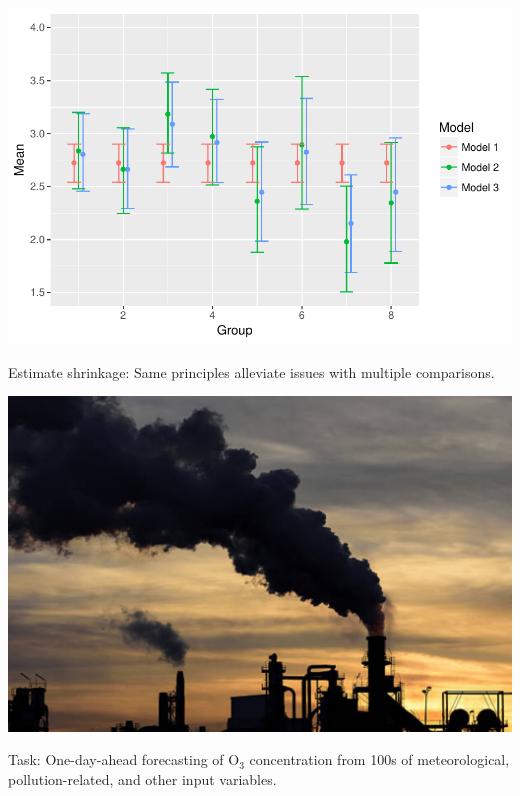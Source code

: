 \begin{frame}
\begin{analysis}

\bigskip

\begin{center}
\includegraphics[scale=0.5]{../LectureAssets/L07/piglets_compare}
\end{center}
\smallskip

\begin{small}
Estimate shrinkage: Same principles alleviate issues with multiple comparisons.

\bigskip
\end{small}

\end{analysis}
\end{frame}


\begin{frame}
\begin{analysis}
\bigskip

\begin{center}
\includegraphics[scale=0.35]{../LectureAssets/L07/pollution}
\end{center}

Task: One-day-ahead forecasting of O$_3$ concentration from 100s of meteorological, pollution-related, and other input variables.
\end{analysis}
\end{frame}


